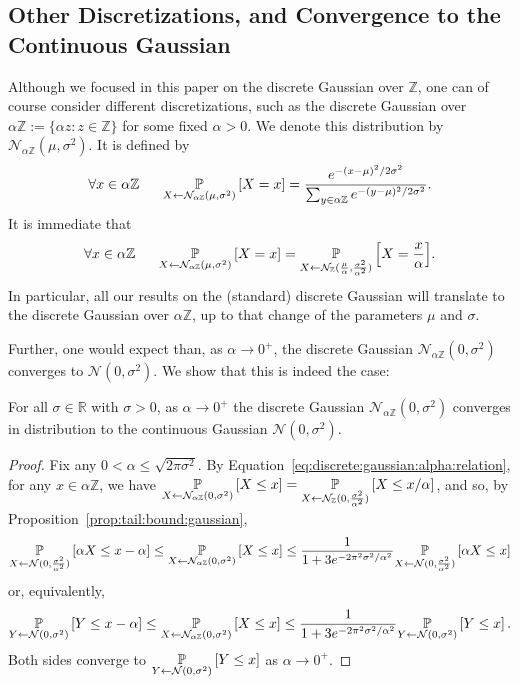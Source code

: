 \documentclass{jpc}
\newcommand{\discparamN}[1]{\mathcal{N}_{#1\Z}}
\newcommand{\pr}[2]{{\ifx&#1& \mathbb{P} \else
\underset{#1}{\mathbb{P}} \fi \left[#2\right]}}
\newcommand{\Z}{\mathbb{Z}}
\newcommand{\R}{\mathbb{R}}
\begin{document}
\subsection{Other Discretizations, and Convergence to the Continuous Gaussian}
\label{sec:other-discs}
Although we focused in this paper on the discrete Gaussian over $\Z$, one can of course consider different discretizations, such as the discrete Gaussian over $\alpha\Z := \{\alpha z : z \in \Z \}$ for some fixed $\alpha>0$. We denote this distribution by $\discparamN{\alpha}(\mu,\sigma^2)$. It is defined by
\begin{equation}
\forall x \in \alpha\Z ~~~~~ \pr{X \gets \discparamN{\alpha}(\mu,\sigma^2)}{X=x}=\frac{e^{-(x-\mu)^2/2\sigma^2}}{\sum_{y \in \alpha\Z} e^{-(y-\mu)^2/2\sigma^2}}.
\end{equation}
It is immediate that
\begin{equation}\label{eq:discrete:gaussian:alpha:relation}
\forall x \in \alpha\Z ~~~~~ \pr{X \gets \discparamN{\alpha}(\mu,\sigma^2)}{X=x}=\pr{X \gets \discN(\frac{\mu}{\alpha}, \frac{\sigma^2}{\alpha^2})}{X=\frac{x}{\alpha}}.
\end{equation}
 In particular, all our results on the (standard) discrete Gaussian will translate to the discrete Gaussian over $\alpha\Z$, up to that change of the parameters $\mu$ and $\sigma$.
 
 Further, one would expect than, as $\alpha \to 0^+$, the discrete Gaussian $\discparamN{\alpha}(0,\sigma^2)$ converges to $\mathcal{N}(0,\sigma^2)$. We show that this is indeed the case:
 \begin{prop}
    For all $\sigma \in \R$ with $\sigma>0$, as $\alpha \to 0^+$ the discrete Gaussian $\discparamN{\alpha}(0,\sigma^2)$ converges in distribution to the continuous Gaussian $\mathcal{N}(0,\sigma^2)$.
 \end{prop}
 \begin{proof}
 Fix any $0 < \alpha \leq \sqrt{2\pi\sigma^2}$. By Equation~\ref{eq:discrete:gaussian:alpha:relation}, for any $x \in \alpha\Z$, we have
 $
      \pr{X \gets \discparamN{\alpha}(0,\sigma^2)}{X\leq x}  = \pr{X \gets \discN(0, \frac{\sigma^2}{\alpha^2})}{X\leq x/\alpha }  
 $, and so, by Proposition~\ref{prop:tail:bound:gaussian},
 \[
         \pr{X \gets \mathcal{N}(0,\frac{\sigma^2}{\alpha^2})}{\alpha X \leq x-\alpha} \leq \pr{X \gets \discparamN{\alpha}(0,\sigma^2)}{X\leq x} \leq \frac{1}{1+3e^{-2\pi^2\sigma^2/\alpha^2}}\pr{X \gets \mathcal{N}(0,\frac{\sigma^2}{\alpha^2})}{\alpha X \le x}
 \]
 or, equivalently,
 \[
         \pr{Y \gets \mathcal{N}(0,\sigma^2)}{Y \leq x-\alpha} \leq \pr{X \gets \discparamN{\alpha}(0,\sigma^2)}{X\leq x} \leq \frac{1}{1+3e^{-2\pi^2\sigma^2/\alpha^2}}\pr{Y \gets \mathcal{N}(0,\sigma^2)}{Y \le x}\,.
 \]
 Both sides converge to $\pr{Y \gets \mathcal{N}(0,\sigma^2)}{Y \leq x}$ as $\alpha \to 0^+$. \end{proof}
  
\end{document}
